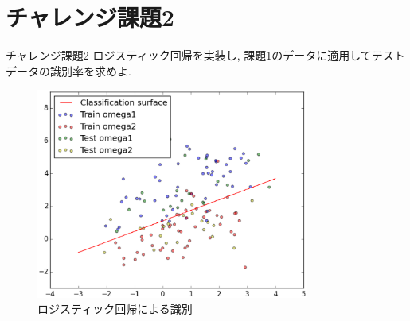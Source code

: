 \section{チャレンジ課題2}\label{section:challenge2}
\begin{itembox}{チャレンジ課題2}
  ロジスティック回帰を実装し,
  課題1のデータに適用してテストデータの識別率を求めよ.
\end{itembox}

\begin{figure}[htbp]
  \centering
  \includegraphics[width=0.8\textwidth]{./assets/challenge2_plot_20150212_000710.eps}
  \caption{ロジスティック回帰による識別}
  \label{fig:challenge2}
\end{figure}
